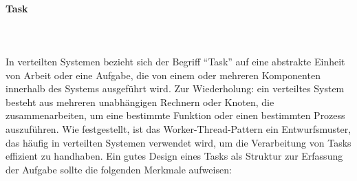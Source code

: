 \documentclass[../vs-script-first-v01.tex]{subfiles}
\begin{document}
\paragraph{Task}\mbox{}\\\\

In verteilten Systemen bezieht sich der Begriff \enquote{Task} auf eine abstrakte Einheit von Arbeit oder eine Aufgabe, die von einem oder mehreren Komponenten innerhalb des Systems ausgeführt wird. Zur Wiederholung: ein verteiltes System besteht aus mehreren unabhängigen Rechnern oder Knoten, die zusammenarbeiten, um eine bestimmte Funktion oder einen bestimmten Prozess auszuführen. Wie festgestellt, ist das Worker-Thread-Pattern ein Entwurfsmuster, das häufig in verteilten Systemen verwendet wird, um die Verarbeitung von Tasks effizient zu handhaben. Ein gutes Design eines Tasks als Struktur zur Erfassung der Aufgabe sollte die folgenden Merkmale aufweisen:
\end{document}

